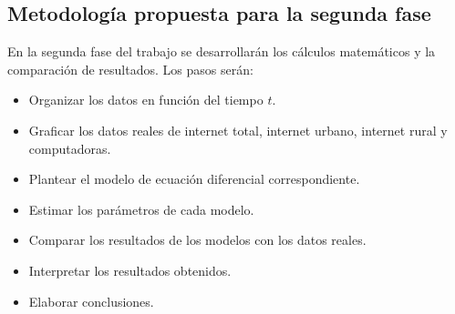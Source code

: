 \subsection{Metodología propuesta para la segunda fase}

En la segunda fase del trabajo se desarrollarán los cálculos matemáticos y la comparación de resultados. Los pasos serán:

\begin{itemize}
    \item Organizar los datos en función del tiempo $t$.
    \item Graficar los datos reales de internet total, internet urbano, internet rural y computadoras.
    \item Plantear el modelo de ecuación diferencial correspondiente.
    \item Estimar los parámetros de cada modelo.
    \item Comparar los resultados de los modelos con los datos reales.
    \item Interpretar los resultados obtenidos.
    \item Elaborar conclusiones.
\end{itemize}
